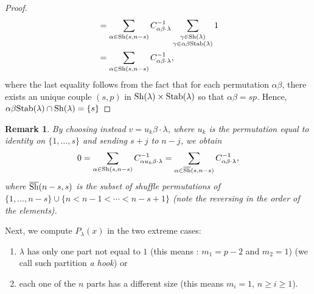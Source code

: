 \documentclass[12pt]{article}
\newtheorem{remark}[theorem]{Remark}
\begin{document}
\begin{proof}
\begin{align*}
&= \sum_{\alpha\in{\rm Sh}(s,n-s)} {C^{-1}_{\alpha\beta \cdot\lambda}} \sum_{\substack{\gamma \in {\rm Sh}(\lambda)\\ \gamma \in \alpha\beta{\rm Stab}{(\lambda)}}} 1\\
&= \sum_{\alpha\in{\rm Sh}(s,n-s)} {C^{-1}_{\alpha\beta \cdot\lambda}},
\end{align*}
where the last equality follows from the fact that for each permutation $\alpha \beta$, there exists an unique couple $(s,p)$ in ${\rm Sh}(\lambda)\times {\rm Stab}(\lambda)$ so that $\alpha\beta =  sp$. Hence, $\alpha\beta {\rm Stab}(\lambda) \cap {\rm Sh}(\lambda)= \{s\} $
\end{proof}
\begin{remark}
By choosing instead $v = u_k\beta  \cdot \lambda $, where $u_k$ is the permutation equal to identity on $\{1,\ldots, s\}$ and sending $s+j$ to $n-j$, we obtain 
$$
0 = \sum_{\alpha\in{\rm Sh}(s,n-s)} {C^{-1}_{\alpha u_k\beta \cdot\lambda}} = \sum_{\alpha\in\overline{\rm Sh}(s,n-s)} {C^{-1}_{\alpha\beta \cdot\lambda}},
$$
where $\overline{\rm Sh}{(n-s,s)}$ is the subset of shuffle permutations of $\{1,\ldots,n-s\}\cup \{n < n-1 < \cdots < n-s+1\}$ (note the reversing in the order of the elements).
\end{remark}
Next, we compute $P_{\lambda}(x)$ in the two extreme cases: 
\begin{enumerate}
\item $\lambda$ has only one part not equal to $1$ (this means : $m_1=p-2$ and $m_2=1$) (we call such partition \emph{a hook}) or
\item each one of the $n$ parts has a different size (this means $m_i=1$, $n \geq i \geq 1$).
\end{enumerate}
\end{document}
